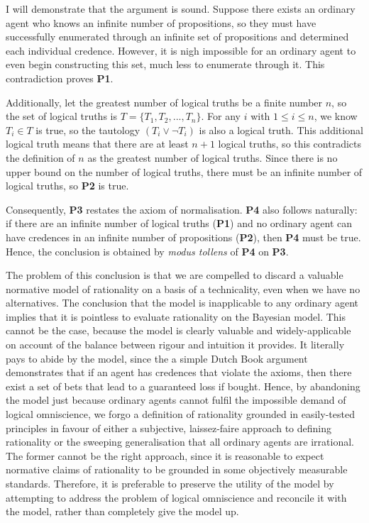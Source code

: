 \documentclass[12pt]{article}
\begin{document}
I will demonstrate that the argument is sound. Suppose there exists an ordinary agent who knows an infinite number of propositions, so they must have successfully enumerated through an infinite set of propositions and determined each individual credence. However, it is nigh impossible for an ordinary agent to even begin constructing this set, much less to enumerate through it. This contradiction proves \textbf{P1}.

Additionally, let the greatest number of logical truths be a finite number $n$, so the set of logical truths is $T=\{T_1,T_2,...,T_n\}$. For any $i$ with $1\leq i\leq n$, we know $T_i\in T$ is true, so the tautology $(T_i\lor\lnot T_i)$ is also a logical truth. This additional logical truth means that there are at least $n+1$ logical truths, so this contradicts the definition of $n$ as the greatest number of logical truths. Since there is no upper bound on the number of logical truths, there must be an infinite number of logical truths, so \textbf{P2} is true.

Consequently, \textbf{P3} restates the axiom of normalisation. \textbf{P4} also follows naturally: if there are an infinite number of logical truths (\textbf{P1}) and no ordinary agent can have credences in an infinite number of propositions (\textbf{P2}), then \textbf{P4} must be true. Hence, the conclusion is obtained by \textit{modus tollens} of \textbf{P4} on \textbf{P3}.

The problem of this conclusion is that we are compelled to discard a valuable normative model of rationality on a basis of a technicality, even when we have no alternatives. The conclusion that the model is inapplicable to any ordinary agent implies that it is pointless to evaluate rationality on the Bayesian model. This cannot be the case, because the model is clearly valuable and widely-applicable on account of the balance between rigour and intuition it provides. It literally pays to abide by the model, since the a simple Dutch Book argument demonstrates that if an agent has credences that violate the axioms, then there exist a set of bets that lead to a guaranteed loss if bought.\autocite[44]{bdrc} Hence, by abandoning the model just because ordinary agents cannot fulfil the impossible demand of logical omniscience, we forgo a definition of rationality grounded in easily-tested principles in favour of either a subjective, laissez-faire approach to defining rationality or the sweeping generalisation that all ordinary agents are irrational. The former cannot be the right approach, since it is reasonable to expect normative claims of rationality to be grounded in some objectively measurable standards. Therefore, it is preferable to preserve the utility of the model by attempting to address the problem of logical omniscience and reconcile it with the model, rather than completely give the model up.
\end{document}
